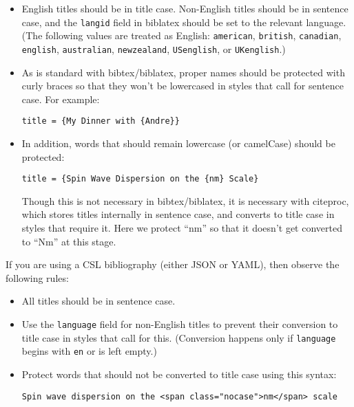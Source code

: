 \documentclass[
]{article}
\begin{document}
\begin{itemize}
\item
  English titles should be in title case. Non-English titles should be
  in sentence case, and the \texttt{langid} field in biblatex should be
  set to the relevant language. (The following values are treated as
  English: \texttt{american}, \texttt{british}, \texttt{canadian},
  \texttt{english}, \texttt{australian}, \texttt{newzealand},
  \texttt{USenglish}, or \texttt{UKenglish}.)
\item
  As is standard with bibtex/biblatex, proper names should be protected
  with curly braces so that they won't be lowercased in styles that call
  for sentence case. For example:

\begin{verbatim}
title = {My Dinner with {Andre}}
\end{verbatim}
\item
  In addition, words that should remain lowercase (or camelCase) should
  be protected:

\begin{verbatim}
title = {Spin Wave Dispersion on the {nm} Scale}
\end{verbatim}

  Though this is not necessary in bibtex/biblatex, it is necessary with
  citeproc, which stores titles internally in sentence case, and
  converts to title case in styles that require it. Here we protect
  ``nm'' so that it doesn't get converted to ``Nm'' at this stage.
\end{itemize}

If you are using a CSL bibliography (either JSON or YAML), then observe
the following rules:

\begin{itemize}
\item
  All titles should be in sentence case.
\item
  Use the \texttt{language} field for non-English titles to prevent
  their conversion to title case in styles that call for this.
  (Conversion happens only if \texttt{language} begins with \texttt{en}
  or is left empty.)
\item
  Protect words that should not be converted to title case using this
  syntax:

\begin{verbatim}
Spin wave dispersion on the <span class="nocase">nm</span> scale
\end{verbatim}
\end{itemize}
\end{document}
